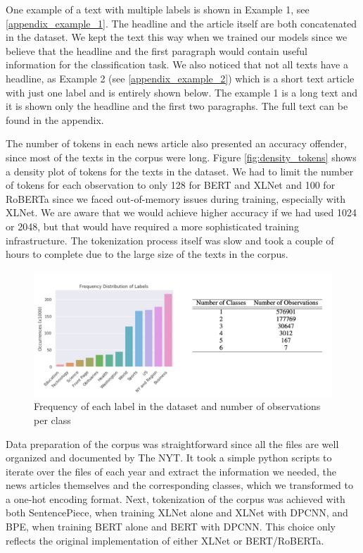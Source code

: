 \documentclass{article}
\begin{document}
One example of a text with multiple labels is shown in Example 1, see \ref{appendix_example_1}. The headline and the article itself are both concatenated in the dataset. We kept the text this way when we trained our models since we believe that the headline and the first paragraph would contain useful information for the classification task. We also noticed that not all texts have a headline, as Example 2 (see \ref{appendix_example_2}) which is a short text article with just one label and is entirely shown below. The example 1 is a long text and it is shown only the headline and the first two paragraphs. The full text can be found in the appendix.

The number of tokens in each news article also presented an accuracy offender, since most of the texts in the corpus were long. Figure \ref{fig:density_tokens} shows a density plot of tokens for the texts in the dataset. We had to limit the number of tokens for each observation to only 128 for BERT and XLNet and 100 for RoBERTa since we faced out-of-memory issues during training, especially with XLNet. We are aware that we would achieve higher accuracy if we had used 1024 or 2048, but that would have required a more sophisticated training infrastructure. The tokenization process itself was slow and took a couple of hours to complete due to the large size of the texts in the corpus.

\begin{figure}
    \centering
    \includegraphics[scale=0.4]{images/labels_and_num_classes.png}
    \caption{Frequency of each label in the dataset and number of observations per class}
    \label{fig:labels_frequency_and_num_classes}
\end{figure}

Data preparation of the corpus was straightforward since all the files are well organized and documented by The NYT. It took a simple python scripts to iterate over the files of each year and extract the information we needed, the news articles themselves and the corresponding classes, which we transformed to a one-hot encoding format. Next, tokenization of the corpus was achieved with both SentencePiece\cite{sentencepiece_ref}, when training XLNet alone and XLNet with DPCNN, and BPE\cite{machine_translation_ref}, when training BERT alone and BERT with DPCNN. This choice only reflects the original implementation of either XLNet or BERT/RoBERTa.
\end{document}
